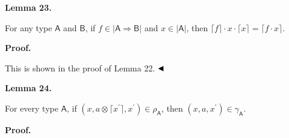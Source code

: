  
 
\par\medskip\noindent\textbf{Lemma 23.}\par
 
 
For any type $\mathsf{A}$ and $\mathsf{B}$, if $f\in|\mathsf{A}\Rightarrow\mathsf{B}|$ and $x\in|\mathsf{A}|$, then $\lceil f\rceil\cdot x\cdot\lceil x\rceil=\lceil f\cdot x\rceil$.\par
 
 
 
 
 
\par\medskip\noindent\textbf{Proof.}\par
 
 
This is shown in the proof of Lemma 22. $\hfill\blacktriangleleft$\par
 
 
 
\par\medskip\noindent\textbf{Lemma 24.}\par
 
 
For every type $\mathsf{A}$, if $(x,a\otimes\lceil x^{\prime}\rceil,x^{\prime})\in\rho_{\mathsf{A}}$, then $(x,a,x^{\prime})\in\gamma_{\mathsf{A}}$.\par
 
 
 
 
 
\par\medskip\noindent\textbf{Proof.}\par
 
 
